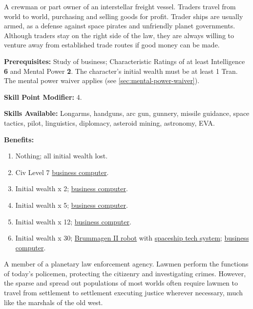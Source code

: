 \bigskip

\pagebreak[2]

\label{sec:prof-interstellar-trader}

A crewman or part owner of an interstellar freight vessel. Traders
travel from world to world, purchasing and selling goods for profit.
Trader ships are usually armed, as a defense against space pirates and
unfriendly planet governments. Although traders stay on the right side
of the law, they are always willing to venture away from established
trade routes if good money can be made.

\textbf{Prerequisites:} Study of business; Characteristic Ratings of
at least Intelligence \textbf{6} and Mental Power \textbf{2}. The
character's initial wealth must be at least 1 Tran. The mental power
waiver applies (see \ref{sec:mental-power-waiver}).

\textbf{Skill Point Modifier:} 4.

\textbf{Skills Available:} Longarms, handguns, arc gun, gunnery,
missile guidance, space tactics, pilot, linguistics, diplomacy,
asteroid mining, astronomy, EVA.

\pagebreak[2]
\textbf{Benefits:}
\begin{enumerate}
\item Nothing; all initial wealth lost.   
\item Civ Level 7 \hyperlink{tag:buscomp}{business computer}.    
\item Initial wealth x 2; \hyperlink{tag:buscomp}{business computer}.  
\item Initial wealth x 5; \hyperlink{tag:buscomp}{business computer}.   
\item Initial wealth x 12; \hyperlink{tag:buscomp}{business computer}.   
\item Initial wealth x 30; \hyperlink{tag:bot-brummagen-ii}{Brummagen II robot} with \hyperlink{tag:bot-spacecraft-tech}{spaceship tech
  system}; \hyperlink{tag:buscomp}{business computer}.
\end{enumerate}

\bigskip

\pagebreak[2]

\label{sec:prof-lawman}

A member of a planetary law enforcement agency. Lawmen perform the
functions of today's policemen, protecting the citizenry and
investigating crimes. However, the sparse and spread out populations
of most worlds often require lawmen to travel from settlement to
settlement executing justice wherever necessary, much like the
marshals of the old west.

